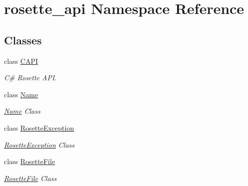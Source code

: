 \hypertarget{namespacerosette__api}{}\section{rosette\+\_\+api Namespace Reference}
\label{namespacerosette__api}
\subsection*{Classes}
\begin{DoxyCompactItemize}
\item 
class \hyperlink{classrosette__api_1_1_c_a_p_i}{C\+A\+P\+I}
\begin{DoxyCompactList}\small\item\em C\# Rosette A\+P\+I. \end{DoxyCompactList}\item 
class \hyperlink{classrosette__api_1_1_name}{Name}
\begin{DoxyCompactList}\small\item\em \hyperlink{classrosette__api_1_1_name}{Name} Class \end{DoxyCompactList}\item 
class \hyperlink{classrosette__api_1_1_rosette_exception}{Rosette\+Exception}
\begin{DoxyCompactList}\small\item\em \hyperlink{classrosette__api_1_1_rosette_exception}{Rosette\+Exception} Class \end{DoxyCompactList}\item 
class \hyperlink{classrosette__api_1_1_rosette_file}{Rosette\+File}
\begin{DoxyCompactList}\small\item\em \hyperlink{classrosette__api_1_1_rosette_file}{Rosette\+File} Class \end{DoxyCompactList}\end{DoxyCompactItemize}
